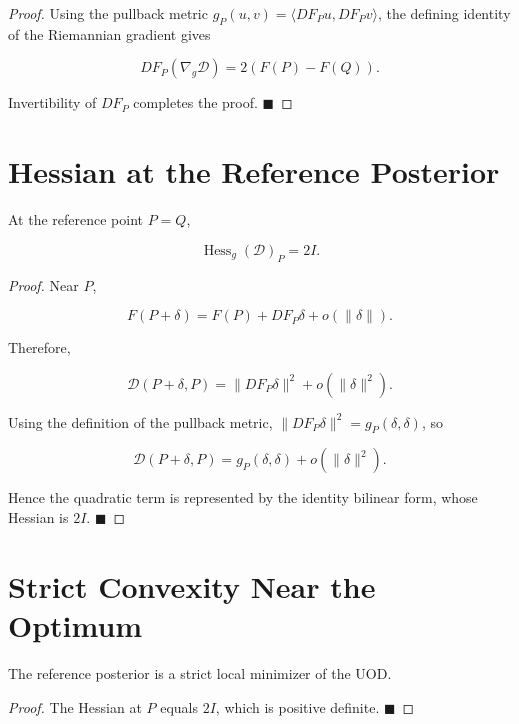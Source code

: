 \begin{proof}
Using the pullback metric \(g_P(u,v)=\langle DF_Pu,DF_Pv\rangle\), the
defining identity of the Riemannian gradient gives

\[
DF_P(\nabla_g\mathcal D)=2(F(P)-F(Q)).
\]

Invertibility of \(DF_P\) completes the proof. $\blacksquare$
\end{proof}

\section{Hessian at the Reference Posterior}\label{ch:sec:hessian-at-the-reference-posterior}

\begin{theorem}
\label{ch:thm:22-4}
At the reference point \(P=Q\),

\[
\operatorname{Hess}_g(\mathcal D)_P = 2I.
\]
\end{theorem}

\begin{proof}
Near \(P\),

\[
F(P+\delta) = F(P)+DF_P\delta+o(\|\delta\|).
\]

Therefore,

\[
\mathcal D(P+\delta,P) = \|DF_P\delta\|^{2}+o(\|\delta\|^{2}).
\]

Using the definition of the pullback metric,
\(\|DF_P\delta\|^{2}=g_P(\delta,\delta)\), so

\[
\mathcal D(P+\delta,P) = g_P(\delta,\delta)+o(\|\delta\|^{2}).
\]

Hence the quadratic term is represented by the identity bilinear form,
whose Hessian is \(2I\). $\blacksquare$
\end{proof}

\section{Strict Convexity Near the Optimum}\label{ch:sec:strict-convexity-near-the-optimum}

\begin{corollary}
\label{ch:cor:22-5}
The reference posterior is a strict local minimizer of the UOD.
\end{corollary}

\begin{proof}
The Hessian at \(P\) equals \(2I\), which is positive definite.
$\blacksquare$
\end{proof}

